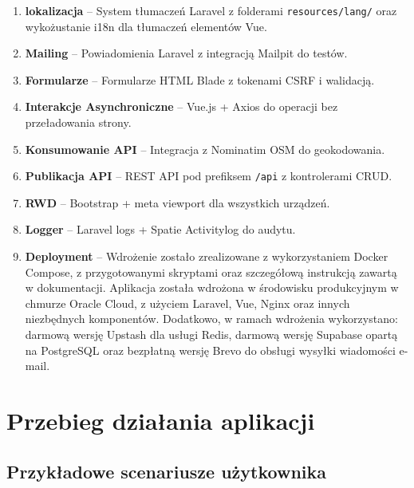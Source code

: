 \documentclass[12pt,a4paper]{article}
\begin{document}
\begin{enumerate}[itemsep=3pt]
    \item \textbf{lokalizacja} -- System tłumaczeń Laravel z folderami \texttt{resources/lang/} oraz wykożustanie i18n dla tłumaczeń elementów Vue.
    
    \item \textbf{Mailing} -- Powiadomienia Laravel z integracją Mailpit do testów.
    
    \item \textbf{Formularze} -- Formularze HTML Blade z tokenami CSRF i walidacją.
    
    \item \textbf{Interakcje Asynchroniczne} -- Vue.js + Axios do operacji bez przeładowania strony.
    
    \item \textbf{Konsumowanie API} -- Integracja z Nominatim OSM do geokodowania.
    
    \item \textbf{Publikacja API} -- REST API pod prefiksem \texttt{/api} z kontrolerami CRUD.
    
    \item \textbf{RWD} -- Bootstrap + meta viewport dla wszystkich urządzeń.
    
    \item \textbf{Logger} -- Laravel logs + Spatie Activitylog do audytu.
    
    \item \textbf{Deployment} -- Wdrożenie zostało zrealizowane z wykorzystaniem Docker Compose, z przygotowanymi skryptami oraz szczegółową instrukcją zawartą w dokumentacji. Aplikacja została wdrożona w środowisku produkcyjnym w chmurze Oracle Cloud, z użyciem Laravel, Vue, Nginx oraz innych niezbędnych komponentów. Dodatkowo, w ramach wdrożenia wykorzystano: darmową wersję Upstash dla usługi Redis, darmową wersję Supabase opartą na PostgreSQL oraz bezpłatną wersję Brevo do obsługi wysyłki wiadomości e-mail.

\end{enumerate}

\section{Przebieg działania aplikacji}

\subsection{Przykładowe scenariusze użytkownika}
\end{document}
